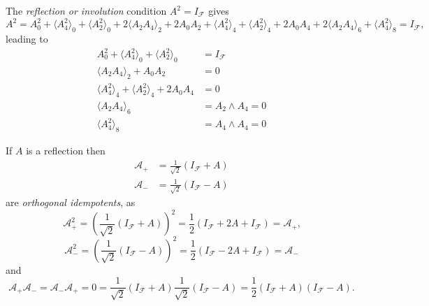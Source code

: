 \documentclass[aps, preprint]{revtex4}
\begin{document}
The \emph{reflection or involution }condition $A^{2} =I_{\mathcal{F}}$ gives
\begin{equation}A^{2} =A_{0}^{2} + \langle A_{4}^{2} \rangle _{0} + \langle A_{2}^{2} \rangle _{0} +2  \langle A_{2} A_{4} \rangle _{2} +2 A_{0} A_{2} + \langle A_{4}^{2} \rangle _{4} + \langle A_{2}^{2} \rangle _{4} +2 A_{0} A_{4} +2  \langle A_{2} A_{4} \rangle _{6} + \langle A_{4}^{2} \rangle _{8} =I_{\mathcal{F}}\text{,}
\end{equation}leading to
\begin{align}A_{0}^{2} + \langle A_{4}^{2} \rangle _{0} + \langle A_{2}^{2} \rangle _{0} &  =I_{\mathcal{F}} \\
 \langle A_{2} A_{4} \rangle _{2} +A_{0} A_{2} &  =0 \\
 \langle A_{4}^{2} \rangle _{4} + \langle A_{2}^{2} \rangle _{4} +2 A_{0} A_{4} &  =0 \\
 \langle A_{2} A_{4} \rangle _{6} &  =A_{2} \wedge A_{4} =0 \\
 \langle A_{4}^{2} \rangle _{8} &  =A_{4} \wedge A_{4} =0\end{align}

If $A$ is a reflection then
\begin{align*}\mathcal{A}_{ +} &  =\frac{1}{\sqrt{2}} \left (I_{\mathcal{F}} +A\right ) \\
\mathcal{A}_{ -} &  =\frac{1}{\sqrt{2}} \left (I_{\mathcal{F}} -A\right )\end{align*}are \emph{orthogonal idempotents}, as
\begin{equation*}\mathcal{A}_{ +}^{2} =\left (\frac{1}{\sqrt{2}} \left (I_{\mathcal{F}} +A\right )\right )^{2} =\frac{1}{2} \left (I_{\mathcal{F}} +2 A +I_{\mathcal{F}}\right ) =\mathcal{A}_{ +}\text{,}
\end{equation*}
\begin{equation*}\mathcal{A}_{ -}^{2} =\left (\frac{1}{\sqrt{2}} \left (I_{\mathcal{F}} -A\right )\right )^{2} =\frac{1}{2} \left (I_{\mathcal{F}} -2 A +I_{\mathcal{F}}\right ) =\mathcal{A}_{ -}
\end{equation*}and
\begin{equation*}\mathcal{A}_{ +} \mathcal{A}_{ -} =\mathcal{A}_{ -} \mathcal{A}_{ +} =0 =\frac{1}{\sqrt{2}} \left (I_{\mathcal{F}} +A\right ) \frac{1}{\sqrt{2}} \left (I_{\mathcal{F}} -A\right ) =\frac{1}{2} \left (I_{\mathcal{F}} +A\right ) \left (I_{\mathcal{F}} -A\right )\text{.}
\end{equation*}
\end{document}
